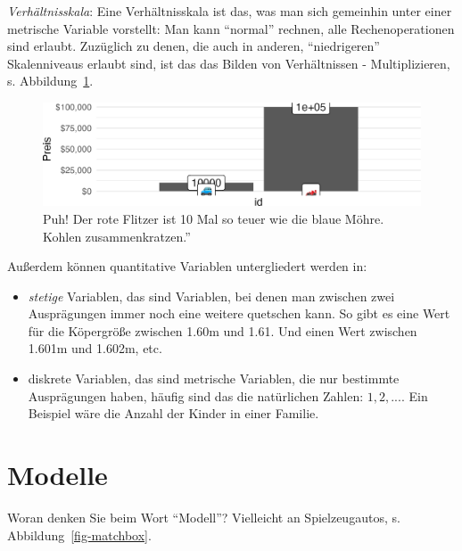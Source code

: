 \documentclass[
  a4paper,
  DIV=11]{scrreprt}
\providecommand{\tightlist}{%
  \setlength{\itemsep}{0pt}\setlength{\parskip}{0pt}}\usepackage{longtable,booktabs,array}
\theoremstyle{definition}
\theoremstyle{definition}
\theoremstyle{remark}
\begin{document}
\emph{Verhältnisskala}: Eine Verhältnisskala ist das, was man sich
gemeinhin unter einer metrische Variable vorstellt: Man kann ``normal''
rechnen, alle Rechenoperationen sind erlaubt. Zuzüglich zu denen, die
auch in anderen, ``niedrigeren'' Skalenniveaus erlaubt sind, ist das das
Bilden von Verhältnissen - Multiplizieren, s.
Abbildung~\ref{fig-verhaeltnis}.

\begin{figure}

{\centering \includegraphics{./fragenstellen_files/figure-pdf/fig-verhaeltnis-1.png}

}

\caption{\label{fig-verhaeltnis}Puh! Der rote Flitzer ist 10 Mal so
teuer wie die blaue Möhre. Kohlen zusammenkratzen.''}

\end{figure}

Außerdem können quantitative Variablen untergliedert werden in:

\begin{itemize}
\tightlist
\item
  \emph{stetige} Variablen, das sind Variablen, bei denen man zwischen
  zwei Ausprägungen immer noch eine weitere quetschen kann. So gibt es
  eine Wert für die Köpergröße zwischen 1.60m und 1.61. Und einen Wert
  zwischen 1.601m und 1.602m, etc.
\item
  diskrete Variablen, das sind metrische Variablen, die nur bestimmte
  Ausprägungen haben, häufig sind das die natürlichen Zahlen:
  \(1,2,...\). Ein Beispiel wäre die Anzahl der Kinder in einer Familie.
\end{itemize}

\hypertarget{modelle}{%
\section{Modelle}\label{modelle}}

Woran denken Sie beim Wort ``Modell''? Vielleicht an Spielzeugautos, s.
Abbildung~\ref{fig-matchbox}.
\end{document}
